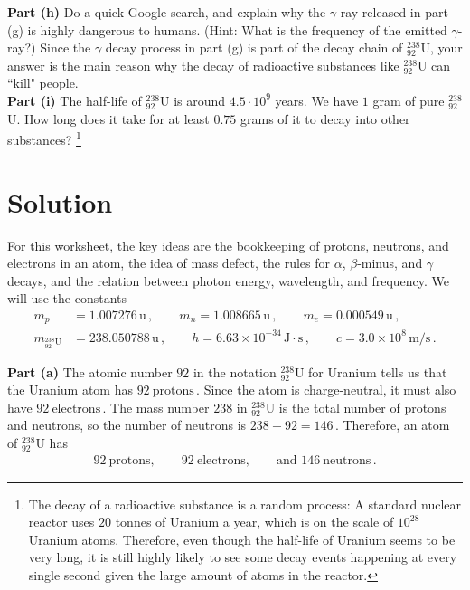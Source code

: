 \documentclass[11pt]{article}
\begin{document}
\noindent\textbf{Part (h)} Do a quick Google search, and explain why the $\gamma$-ray released in part (g) is highly dangerous to humans. (Hint: What is the frequency of the emitted $\gamma$-ray?) Since the $\gamma$ decay process in part (g) is part of the decay chain of $^{238}_{92}$U, your answer is the main reason why the decay of radioactive substances like $^{238}_{92}$U can ``kill" people. \\

\noindent\textbf{Part (i)} The half-life of $^{238}_{92}$U is around $4.5\cdot 10^9$ years. We have $1$ gram of pure $^{238}_{92}$U. How long does it take for at least $0.75$ grams of it to decay into other substances? \footnote{The decay of a radioactive substance is a random process: A standard nuclear reactor uses $20$ tonnes of Uranium a year, which is on the scale of $10^{28}$ Uranium atoms. Therefore, even though the half-life of Uranium seems to be very long, it is still highly likely to see some decay events happening at every single second given the large amount of atoms in the reactor.}

\newpage


\section*{Solution}
For this worksheet, the key ideas are the bookkeeping of protons, neutrons, and electrons in an atom, the idea of mass defect, the rules for $\alpha$, $\beta$-minus, and $\gamma$ decays, and the relation between photon energy, wavelength, and frequency. We will use the constants
\begin{align*}
m_p &= 1.007276\,\text{u}\,,\qquad
m_n = 1.008665\,\text{u}\,,\qquad
m_e = 0.000549\,\text{u}\,,\\
m_{{}^{238}_{92}\text{U}} &= 238.050788\,\text{u}\,,\qquad
h = 6.63\times 10^{-34}\,\text{J}\cdot\text{s}\,,\qquad
c = 3.0\times 10^8\,\text{m/s}\,.
\end{align*}

\noindent\textbf{Part (a)} The atomic number $92$ in the notation ${}^{238}_{92}\text{U}$ for Uranium tells us that the Uranium atom has $
92\ \text{protons}\,.$ Since the atom is charge-neutral, it must also have $
92\ \text{electrons}\,.$ The mass number $238$ in ${}^{238}_{92}\text{U}$ is the total number of protons and neutrons, so the number of neutrons is $
238-92 = 146\,.$ Therefore, an atom of $^{238}_{92}\text{U}$ has
\begin{align*}
92\ \text{protons},\qquad 92\ \text{electrons},\qquad \text{and } 146\ \text{neutrons}\,.
\end{align*}
\end{document}
